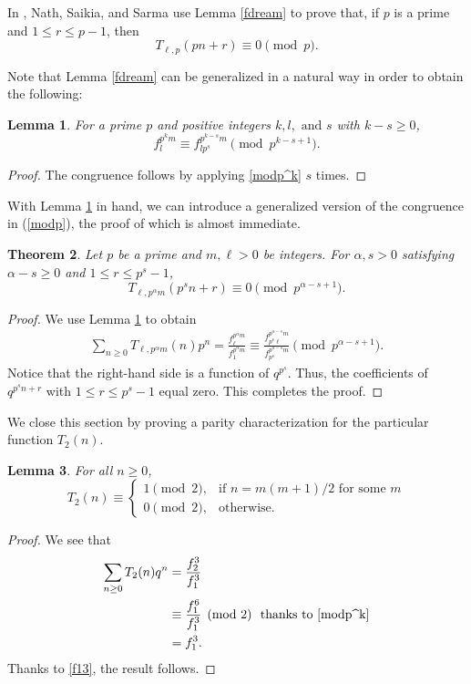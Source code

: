 \documentclass{amsart}
\newtheorem{theorem}{Theorem}[section]
\newtheorem{lemma}[theorem]{Lemma}
\theoremstyle{definition}
\begin{document}
In \cite[Theorem 1.1]{Nath-Saikia-Sarma}, Nath, Saikia, and Sarma use Lemma \ref{fdream} to prove that, if $p$ is a prime and $1\leq r\leq p-1$, then 
\begin{equation}\label{modp}
T_{\ell,p}(pn+r)\equiv0\pmod{p}.\end{equation}


Note that Lemma \ref{fdream} can be generalized in a natural way in order to obtain the following:  

\begin{lemma}\label{cor.modp^k}
For a prime $p$ and positive integers $k,l,\text{ and }s$ with $k-s\geq0$,
\begin{equation}
        f_l^{p^km}\equiv f_{lp^{s}}^{p^{k-s}m}\pmod{p^{k-s+1}}.
    \end{equation}
\end{lemma}
\begin{proof}
    The congruence follows by applying \eqref{modp^k} $s$ times.
\end{proof}

With Lemma \ref{cor.modp^k} in hand, we can introduce a generalized version of the congruence in (\ref{modp}), the proof of which is almost immediate. 

\begin{theorem}\label{thm.gen1.1}
Let $p$ be a prime and $m, \ell>0$ be integers. For $\alpha, s>0$ satisfying $\alpha-s\ge 0$ and $1\leq r\leq p^s-1$,
\[T_{\ell,p^\alpha m}(p^s n+r)\equiv 0 \pmod{p^{\alpha-s+1}}.\]
\end{theorem}
\begin{proof}
We use Lemma \ref{cor.modp^k} to obtain 
    \begin{align*}
            \sum_{n\geq0} T_{\ell,p^\alpha m}(n)p^n=\frac{f_\ell^{p^\alpha m}}{f_1^{p^\alpha m}}\equiv \frac{f_{p^s\ell}^{p^{\alpha-s} m}}{f_{p^s}^{p^{\alpha-s} m}}\pmod{p^{\alpha-s+1}}.
    \end{align*}
Notice that the right-hand side is a function of $q^{p^s}$. Thus, the coefficients of $q^{p^sn+r}$ with $1\leq r\leq p^s-1$ equal zero. This completes the proof.
\end{proof}


We close this section by proving a parity characterization for the particular function $T_2(n)$.
\begin{lemma} \label{mod2}
For all $n\geq 0$, 
$$
T_2(n) \equiv \begin{cases}
			1\pmod{2}, & \text{if $n = m(m+1)/2$ for some $m$}\\
            0\pmod{2}, & \text{otherwise}.
		 \end{cases}
$$
\end{lemma}
\begin{proof}
We see that 
\begin{align*}
\sum_{n\geq0}T_2(n)q^n
&= \frac{f_2^3}{f_1^3} \\
&\equiv \frac{f_1^6}{f_1^3} \pmod{2} \text{\ \ thanks to  \eqref{modp^k}} \\
&= f_1^3.
\end{align*}
Thanks to  \eqref{f13}, the result follows.  
\end{proof}
\end{document}
